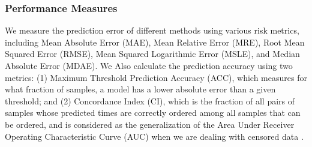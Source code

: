 \subsubsection{Performance Measures}
We measure the prediction error of different methods using various risk metrics, including Mean Absolute Error (MAE), Mean Relative Error (MRE), Root Mean Squared Error (RMSE), Mean Squared Logarithmic Error (MSLE), and Median Absolute Error (MDAE). We Also calculate the prediction accuracy using two metrics: (1) Maximum Threshold Prediction Accuracy (ACC), which measures for what fraction of samples, a model has a lower absolute error than a given threshold; and (2) Concordance Index (CI), which is the fraction of all pairs of samples whose predicted times are correctly ordered among all samples that can be ordered, and is considered as the generalization of the Area Under Receiver Operating Characteristic Curve (AUC) when we are dealing with censored data \cite{steck2008ranking}.

